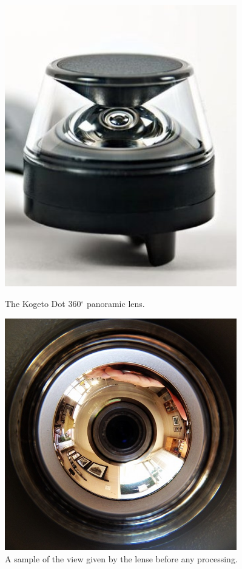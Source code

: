 \documentclass[a4paper,12pt]{article}
\begin{document}
\begin{figure}[t!]
  \centering
  \begin{minipage}[t!]{0.45\textwidth}
    \centering
    \includegraphics[width=0.9\textwidth]{KogetoDot}
    \caption{The Kogeto Dot 360$^\circ$ panoramic lens.}
  \end{minipage}
  \hfill
  \begin{minipage}[t!]{0.45\textwidth}
    \centering
    \includegraphics[width=0.9\textwidth]{PanoramicView}
    \caption{A sample of the view given by the lense before any processing.}
  \end{minipage}

\end{figure}
\end{document}

